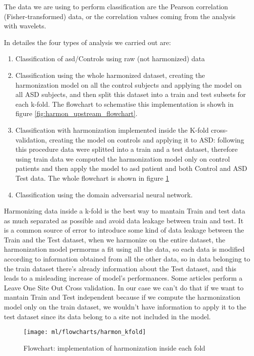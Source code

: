 \documentclass[a4paper,11pt]{article}
\begin{document}
The data we are using to perform classification are the Pearson correlation (Fisher-transformed) data, or the correlation values coming from the analysis with wavelets.



In detailes the four types of analysis we carried out are:
\begin{enumerate}
\item Classification of asd/Controls using raw (not harmonized) data
\item Classification using the whole harmonized dataset, creating the harmonization model on all the control subjects and applying the model on all ASD subjects, and then split this dataset into a train and test subsets for each k-fold. The flowchart to schematise this implementation is showh in figure \ref{fig:harmon_upstream_flowchart}.
\item Classification with harmonization implemented inside the K-fold cross-validation, creating the model on controls and applying it to ASD: following this procedure data were splitted into a train and a test dataset, therefore using train data we computed the harmonization model only on control patients and then apply the model to asd patient and both Control and ASD Test data.
The whole flowchart is shown in figure \ref{fig:harmon_kfold_flowchart}
\item Classification using the domain adversarial neural network.
\end{enumerate}

Harmonizing data inside a k-fold is the best way to mantain Train and test data as much separated as possible and avoid data leakage between train and test.
It is a common source of error to introduce some kind of data leakage between the Train and the Test dataset, when we harmonize on the entire dataset, the harmonization model permorms a fit using all the data, so each data is modified according to information obtained from all the other data, so in data belonging to the train dataset there's already information about the Test dataset, and this leads to a misleading increase of model's performances.
Some articles perform a Leave One Site Out Cross validation. In our case we can't do that if we want to mantain Train and Test independent because if we compute the harmonization model only on the train dataset, we wouldn't have information to apply it to the test dataset since its data belong to a site not included in the model.



\begin{figure}[h!]
\centering
\texttt{[image: ml/flowcharts/harmon\_kfold]}
\caption{Flowchart: implementation of harmonization inside each fold}
\label{fig:harmon_kfold_flowchart}
\end{figure}
\end{document}
